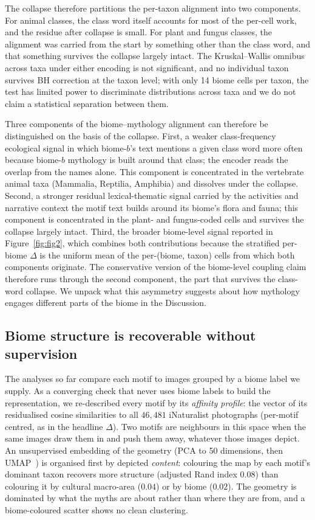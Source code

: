\documentclass[11pt,a4paper]{article}
\begin{document}
The collapse therefore partitions the per-taxon alignment into
two components. For animal classes, the class word itself
accounts for most of the per-cell work, and the residue after
collapse is small. For plant and fungus classes, the alignment
was carried from the start by something other than the class
word, and that something survives the collapse largely intact.
The Kruskal--Wallis omnibus across taxa under either encoding is
not significant, and no individual taxon survives BH correction
at the taxon level; with only 14 biome cells per taxon, the test
has limited power to discriminate distributions across taxa and
we do not claim a statistical separation between them.

Three components of the biome--mythology alignment can therefore
be distinguished on the basis of the collapse. First, a weaker
class-frequency ecological signal in which biome-$b$'s text
mentions a given class word more often because biome-$b$
mythology is built around that class; the encoder reads the
overlap from the names alone. This component is concentrated in
the vertebrate animal taxa (Mammalia, Reptilia, Amphibia) and
dissolves under the collapse. Second, a stronger residual
lexical-thematic signal carried by the activities and narrative
context the motif text builds around its biome's flora and
fauna; this component is concentrated in the plant- and
fungus-coded cells and survives the collapse largely intact.
Third, the broader biome-level signal reported in
Figure~\ref{fig:fig2}, which combines both contributions because
the stratified per-biome $\Delta$ is the uniform mean of the
per-(biome, taxon) cells from which both components originate.
The conservative version of the biome-level coupling claim
therefore runs through the second component, the part that
survives the class-word collapse. We unpack what this asymmetry
suggests about how mythology engages different parts of the
biome in the Discussion.

\subsection*{Biome structure is recoverable without supervision}

The analyses so far compare each motif to images grouped by a
biome label we supply. As a converging check that never uses biome
labels to build the representation, we re-described every motif by
its \emph{affinity profile}: the vector of its residualised cosine
similarities to all $46{,}481$ iNaturalist photographs (per-motif
centred, as in the headline $\Delta$). Two motifs are neighbours in
this space when the same images draw them in and push them away,
whatever those images depict. An unsupervised embedding of the
geometry (PCA to 50 dimensions, then
UMAP~\citep{mcinnes2018umap}) is organised first by
depicted \emph{content}: colouring the map by each motif's dominant
taxon recovers more structure (adjusted Rand index $0.08$) than
colouring it by cultural macro-area ($0.04$) or by biome ($0.02$).
The geometry is dominated by what the myths are about rather than
where they are from, and a biome-coloured scatter shows no clean
clustering.
\end{document}
